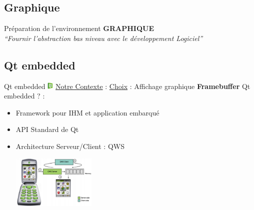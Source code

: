 \documentclass[11pt]{beamer}
\begin{document}
	\subsection{Graphique}
	\begin{frame}
	\begin{center}
	  Préparation de l'environnement \textbf{GRAPHIQUE}\\
	  \textit{``Fournir l'abstraction bas niveau avec le développement Logiciel'' }
	\end{center}
	\end{frame}
	
	\subsection{Qt embedded}
	\begin{frame}[label=pageQt]{Qt embedded  \includegraphics[width=0.3cm]{common/Qt.jpeg}}
	  \underline{Notre Contexte} : \hyperlink{Qt}{}
	  \newline
	  \underline{Choix} : Affichage graphique \textbf{Framebuffer}
	  \newline
	  \newline
	  Qt embedded ? :
	  \begin{itemize}
			    \item Framework pour IHM et application embarqué
			    \item API Standard de Qt
			    \item Architecture Serveur/Client : QWS
			      \begin{center}
			       \includegraphics[width=4cm]{common/Qtembedded.png}\\
			      \end{center}
	   \end{itemize}
	  
	  
	  \end{frame}
	
\end{document}
